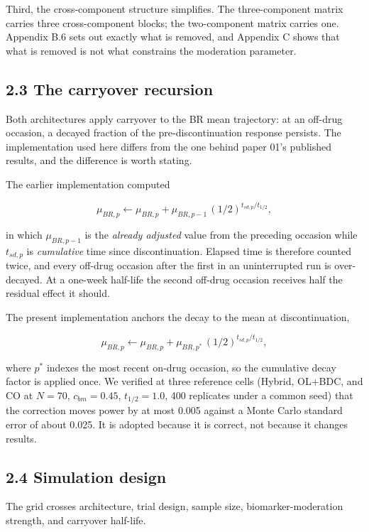 \documentclass[
  11pt,
]{article}
\begin{document}
Third, the cross-component structure simplifies. The three-component
matrix carries three cross-component blocks; the two-component matrix
carries one. Appendix B.6 sets out exactly what is removed, and
Appendix C shows that what is removed is not what constrains the
moderation parameter.

\subsection{2.3 The carryover recursion}

Both architectures apply carryover to the BR mean trajectory: at an
off-drug occasion, a decayed fraction of the pre-discontinuation
response persists. The implementation used here differs from the one
behind paper 01's published results, and the difference is worth
stating.

The earlier implementation computed

\[
\mu_{BR,p} \leftarrow \mu_{BR,p} + \mu_{BR,p-1}\,
  (1/2)^{t_{sd,p}/t_{1/2}},
\]

in which \(\mu_{BR,p-1}\) is the \emph{already adjusted} value from the
preceding occasion while \(t_{sd,p}\) is \emph{cumulative} time since
discontinuation. Elapsed time is therefore counted twice, and every
off-drug occasion after the first in an uninterrupted run is
over-decayed. At a one-week half-life the second off-drug occasion
receives half the residual effect it should.

The present implementation anchors the decay to the mean at
discontinuation,

\[
\mu_{BR,p} \leftarrow \mu_{BR,p} + \mu_{BR,p^{\ast}}\,
  (1/2)^{t_{sd,p}/t_{1/2}},
\]

where \(p^{\ast}\) indexes the most recent on-drug occasion, so the
cumulative decay factor is applied once. We verified at three
reference cells (Hybrid, OL+BDC, and CO at \(N = 70\), \(c_{bm} = 0.45\),
\(t_{1/2} = 1.0\), 400 replicates under a common seed) that the
correction moves power by at most 0.005 against a Monte Carlo
standard error of about 0.025. It is adopted because it is correct,
not because it changes results.

\subsection{2.4 Simulation design}

The grid crosses architecture, trial design, sample size,
biomarker-moderation strength, and carryover half-life.
\end{document}
